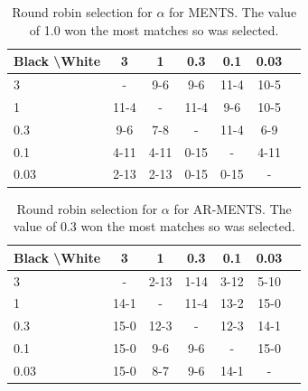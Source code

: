     
    
    
    \begin{table}[tbp]
    \centering
        \begin{tabular}{l|cccccc}
            \textbf{Black \textbackslash White}     & 3  & 1   & 0.3   & 0.1    & 0.03    \\ 
            \hline
                                    3            & -     	&   	9-6	&  9-6 		&   	11-4	&  10-5 		\\
                                    1            & 11-4  		& -     	&  11-4		&  9-6 		& 10-5  		\\
                                    0.3          &  9-6  	&  7-8  	&   -   &  11-4 		&  6-9 		\\
                                    0.1          &  4-11 		&   4-11		&   0-15		& -     	&  4-11 		\\
                                    0.03         &   	2-13	&  2-13 		&  0-15 		&   0-15		&   -   	\\      
        \end{tabular}
        \caption[Round robin  selection for $\alpha$ for MENTS.]{Round robin  selection for $\alpha$ for MENTS. The value of 1.0 won the most matches so was selected. \label{tab:w040}}
    \end{table}
    
    \begin{table}[tbp]
    \centering
        \begin{tabular}{l|cccccc}
            \textbf{Black \textbackslash White}     & 3  & 1   & 0.3   & 0.1    & 0.03    \\ 
            \hline
                                    3            & -     	&  2-13 		& 1-14  		& 3-12  		& 5-10  		\\
                                    1            &  14-1 		& -     	& 11-4 		& 13-2  		& 15-0  		\\
                                    0.3          &  15-0  	&  12-3  	&   -   &  12-3 		& 14-1  		\\
                                    0.1          &   15-0		&  9-6 		&  9-6 		& -     	&  15-0 		\\
                                    0.03         &   15-0		&  8-7 		&  9-6 		& 14-1  		&   -   	\\    
        \end{tabular}
        \caption[Round robin  selection for $\alpha$ for AR-MENTS.]{Round robin  selection for $\alpha$ for AR-MENTS. The value of 0.3 won the most matches so was selected. \label{tab:x040}}
    \end{table}
    
